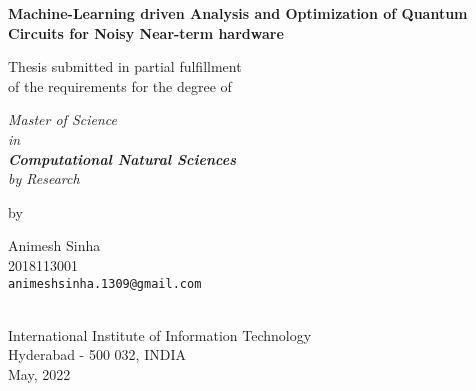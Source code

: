 \thispagestyle{empty}
\begin{center}
\vspace*{1.5cm}
{\Large \bf Machine-Learning driven Analysis and Optimization of Quantum Circuits for Noisy Near-term hardware}

\vspace*{3.75cm}
{\large Thesis submitted in partial fulfillment\\}
{\large  of the requirements for the degree of \\}

\vspace*{1cm}
{\it {\large Master of Science \\ in \\ \textbf{Computational Natural Sciences} \\ by Research}\\}
    

\vspace*{1cm}
{\large by}

\vspace*{5mm}
{\large Animesh Sinha\\}
{\large 2018113001\\
{\small \tt animeshsinha.1309@gmail.com}}


\vspace*{4.0cm}
{\\}
{\large International Institute of Information Technology\\}
{\large Hyderabad - 500 032, INDIA\\}
{\large May, 2022\\}
\end{center}